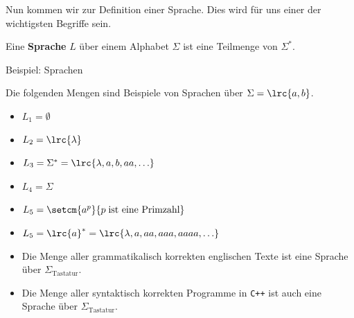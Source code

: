 \begin{frame}[fragile]
Nun kommen wir zur Definition einer Sprache. Dies wird für uns einer der wichtigsten Begriffe sein.
\begin{mydefinition}[Sprache]\label{mydefinition:Sprache}
Eine \textbf{Sprache} $L$ über einem Alphabet $\Sigma$ ist eine Teilmenge von $\Sigma^*$.
\end{mydefinition}
\end{frame}

\begin{frame}[fragile]{Beispiel: Sprachen}
    \begin{myexample}
Die folgenden Mengen sind Beispiele von Sprachen über $\Sigma = \lrc{a,b}$.
\begin{itemize}[<+->]
	\item $L_1 = \emptyset$
	\item $L_2 = \lrc{\lambda}$
	\item $L_3 = \Sigma^* = \lrc{\lambda, a,b,aa,\ldots }$
	\item $L_4 = \Sigma$
	\item $L_5 = \setcm{a^p}{p\;\text{ist eine Primzahl}}$
	\item $L_5 = \lrc{a}^* = \lrc{\lambda, a, aa, aaa, aaaa, \ldots }$
\end{itemize}
\end{myexample}
\end{frame}

\begin{frame}[fragile]
\begin{myexample}\leavevmode
\begin{itemize}
	\item Die Menge aller grammatikalisch korrekten englischen Texte ist eine Sprache über $\Sigma_{\text{Tastatur}}$.
	\item Die Menge aller syntaktisch korrekten Programme in {\tt C++} ist auch eine Sprache über $\Sigma_{\text{Tastatur}}$.
\end{itemize}
\end{myexample}
\end{frame}


